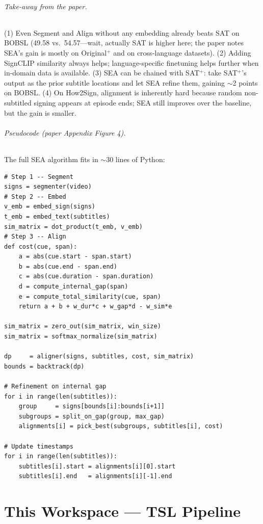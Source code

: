 \documentclass[11pt,a4paper]{article}
\def\emph#1{#1}%
\begin{document}
\paragraph{Take-away from the paper.} (1) Even \emph{Segment and Align}
without any embedding already beats SAT on BOBSL (49.58 vs.\ 54.57---wait,
actually SAT is higher here; the paper notes SEA's gain is mostly on
\emph{Original$^{+}$} and on cross-language datasets). (2) Adding SignCLIP
similarity always helps; language-specific finetuning helps further when
in-domain data is available. (3) SEA can be \emph{chained} with SAT$^{+}$:
take SAT$^{+}$'s output as the prior subtitle locations and let SEA refine
them, gaining $\sim$2 points on BOBSL. (4) On How2Sign, alignment is
inherently hard because random non-subtitled signing appears at episode
ends; SEA still improves over the baseline, but the gain is smaller.

\paragraph{Pseudocode (paper Appendix Figure 4).} The full SEA algorithm
fits in $\sim$30 lines of Python:

\begin{lstlisting}
# Step 1 -- Segment
signs = segmenter(video)
# Step 2 -- Embed
v_emb = embed_sign(signs)
t_emb = embed_text(subtitles)
sim_matrix = dot_product(t_emb, v_emb)
# Step 3 -- Align
def cost(cue, span):
    a = abs(cue.start - span.start)
    b = abs(cue.end - span.end)
    c = abs(cue.duration - span.duration)
    d = compute_internal_gap(span)
    e = compute_total_similarity(cue, span)
    return a + b + w_dur*c + w_gap*d - w_sim*e

sim_matrix = zero_out(sim_matrix, win_size)
sim_matrix = softmax_normalize(sim_matrix)

dp     = aligner(signs, subtitles, cost, sim_matrix)
bounds = backtrack(dp)

# Refinement on internal gap
for i in range(len(subtitles)):
    group     = signs[bounds[i]:bounds[i+1]]
    subgroups = split_on_gap(group, max_gap)
    alignments[i] = pick_best(subgroups, subtitles[i], cost)

# Update timestamps
for i in range(len(subtitles)):
    subtitles[i].start = alignments[i][0].start
    subtitles[i].end   = alignments[i][-1].end
\end{lstlisting}

\clearpage
\part{This Workspace --- TSL Pipeline}
\end{document}
